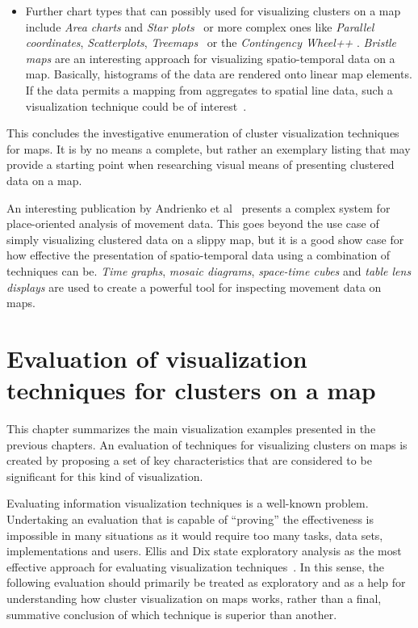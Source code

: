 \begin{itemize}
\begin{itemize}
\item Further chart types that can possibly used for visualizing clusters on a map include \textit{Area charts} and \textit{Star plots}~\cite{ladenhauf12dia} or more complex ones like \textit{Parallel coordinates}, \textit{Scatterplots}, \textit{Treemaps}~\cite{zhang07thesis} or the \textit{Contingency Wheel++} \cite{VAST2012}. \textit{Bristle maps} are an interesting approach for visualizing spatio-temporal data on a map. Basically, histograms of the data are rendered onto linear map elements. If the data permits a mapping from aggregates to spatial line data, such a visualization technique could be of interest~\cite{bristle}.

\end{itemize}

\end{itemize}

This concludes the investigative enumeration of cluster visualization techniques for maps. It is by no means a complete, but rather an exemplary listing that may provide a starting point when researching visual means of presenting clustered data on a map.

An interesting publication by Andrienko et al~\cite{andrienko2012sca} presents a complex system for place-oriented analysis of movement data. This goes beyond the use case of simply visualizing clustered data on a slippy map, but it is a good show case for how effective the presentation of spatio-temporal data using a combination of techniques can be. \textit{Time graphs}, \textit{mosaic diagrams}, \textit{space-time cubes} and \textit{table lens displays} are used to create a powerful tool for inspecting movement data on maps.

\section{Evaluation of visualization techniques for clusters on a map}

This chapter summarizes the main visualization examples presented in the previous chapters. An evaluation of techniques for visualizing clusters on maps is created by proposing a set of key characteristics that are considered to be significant for this kind of visualization.

Evaluating information visualization techniques is a well-known problem. Undertaking an evaluation that is capable of ``proving'' the effectiveness is impossible in many situations as it would require too many tasks, data sets, implementations and users. Ellis and Dix state exploratory analysis as the most effective approach for evaluating visualization techniques~\cite{ellis06eval, Delort10vis}. In this sense, the following evaluation should primarily be treated as exploratory and as a help for understanding how cluster visualization on maps works, rather than a final, summative conclusion of which technique is superior than another. 

